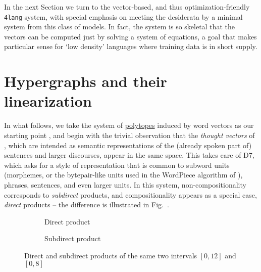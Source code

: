 \documentclass[output=paper,colorlinks=true,citecolor=brown]{langscibook}
\begin{document}
In the next Section we turn to the vector-based, and thus
optimization-friendly \texttt{4lang} system, with special emphasis on meeting
the desiderata by a minimal system from this class of models. In fact, the
system is so skeletal that the vectors can be computed just by solving a
system of equations, a goal that makes particular sense for `low density'
languages where training data is in short supply.

\section{Hypergraphs and their linearization}\label{4lang}

In what follows, we take the system of
\href{https://en.wikipedia.org/wiki/Polytope}{polytopes} induced by word
vectors as our starting point \citep{Kornai:2022}, and begin with the trivial
observation that the \emph{thought vectors} of \citet{LeCun:2015}, which are
intended as semantic representations of the (already spoken part of) sentences
and larger discourses, appear in the same space. This takes care of D7, which
asks for a style of representation that is common to subword units (morphemes,
or the bytepair-like units used in the WordPiece algorithm of \cite{Wu:2016}),
phrases, sentences, and even larger units. In this system,
non-compositionality corresponds to \emph{subdirect} products, and
compositionality appears as a special case, \emph{direct} products
\citep{Kornai:2010} -- the difference is illustrated in
Fig.~.


\begin{figure}[h]
    \centering
    \begin{subfigure}[t]{0.5\textwidth}
	\centering
        \caption{Direct product}
    \end{subfigure}%
    \begin{subfigure}[t]{0.5\textwidth}
        \centering
                \caption{Subdirect product}
    \end{subfigure}
    \caption{Direct and subdirect products of the same two intervals $[0,12]$ and $[0,8]$}\label{fig:dirsubdir}
\end{figure}
\end{document}
